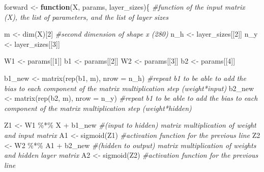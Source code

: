\documentclass[
]{article}
\newenvironment{Shaded}{\begin{snugshade}}{\end{snugshade}}
\newcommand{\AttributeTok}[1]{\textcolor[rgb]{0.77,0.63,0.00}{#1}}
\newcommand{\CommentTok}[1]{\textcolor[rgb]{0.56,0.35,0.01}{\textit{#1}}}
\newcommand{\ControlFlowTok}[1]{\textcolor[rgb]{0.13,0.29,0.53}{\textbf{#1}}}
\newcommand{\DecValTok}[1]{\textcolor[rgb]{0.00,0.00,0.81}{#1}}
\newcommand{\FunctionTok}[1]{\textcolor[rgb]{0.00,0.00,0.00}{#1}}
\newcommand{\NormalTok}[1]{#1}
\newcommand{\OtherTok}[1]{\textcolor[rgb]{0.56,0.35,0.01}{#1}}
\newcommand{\SpecialCharTok}[1]{\textcolor[rgb]{0.00,0.00,0.00}{#1}}
\begin{document}
\begin{Shaded}
\begin{Highlighting}[]
\NormalTok{forward }\OtherTok{\textless{}{-}} \ControlFlowTok{function}\NormalTok{(X, params, layer\_sizes)\{}
\CommentTok{\#function of the input matrix (X), the list of parameters, and the list of layer sizes}
  
\NormalTok{  m }\OtherTok{\textless{}{-}} \FunctionTok{dim}\NormalTok{(X)[}\DecValTok{2}\NormalTok{]  }\CommentTok{\#second dimension of shape x (280)}
\NormalTok{  n\_h }\OtherTok{\textless{}{-}}\NormalTok{ layer\_sizes[[}\DecValTok{2}\NormalTok{]]}
\NormalTok{  n\_y }\OtherTok{\textless{}{-}}\NormalTok{ layer\_sizes[[}\DecValTok{3}\NormalTok{]]}
  
\NormalTok{  W1 }\OtherTok{\textless{}{-}}\NormalTok{ params[[}\DecValTok{1}\NormalTok{]]}
\NormalTok{  b1 }\OtherTok{\textless{}{-}}\NormalTok{ params[[}\DecValTok{2}\NormalTok{]]}
\NormalTok{  W2 }\OtherTok{\textless{}{-}}\NormalTok{ params[[}\DecValTok{3}\NormalTok{]]}
\NormalTok{  b2 }\OtherTok{\textless{}{-}}\NormalTok{ params[[}\DecValTok{4}\NormalTok{]]}
  
\NormalTok{  b1\_new }\OtherTok{\textless{}{-}} \FunctionTok{matrix}\NormalTok{(}\FunctionTok{rep}\NormalTok{(b1, m), }\AttributeTok{nrow =}\NormalTok{ n\_h)  }\CommentTok{\#repeat b1 to be able to add the bias to each component of the matrix                                               multiplication step (weight*input)}
\NormalTok{  b2\_new }\OtherTok{\textless{}{-}} \FunctionTok{matrix}\NormalTok{(}\FunctionTok{rep}\NormalTok{(b2, m), }\AttributeTok{nrow =}\NormalTok{ n\_y)  }\CommentTok{\#repeat b1 to be able to add the bias to each component of the matrix                                               multiplication step (weight*hidden)}
  
\NormalTok{  Z1 }\OtherTok{\textless{}{-}}\NormalTok{ W1 }\SpecialCharTok{\%*\%}\NormalTok{ X }\SpecialCharTok{+}\NormalTok{ b1\_new  }\CommentTok{\#(input to hidden) matrix multiplication of weight and input matrix}
\NormalTok{  A1 }\OtherTok{\textless{}{-}} \FunctionTok{sigmoid}\NormalTok{(Z1) }\CommentTok{\#activation function for the previous line}
\NormalTok{  Z2 }\OtherTok{\textless{}{-}}\NormalTok{ W2 }\SpecialCharTok{\%*\%}\NormalTok{ A1 }\SpecialCharTok{+}\NormalTok{ b2\_new }\CommentTok{\#(hidden to output) matrix multiplication of weights and hidden layer matrix}
\NormalTok{  A2 }\OtherTok{\textless{}{-}} \FunctionTok{sigmoid}\NormalTok{(Z2) }\CommentTok{\#activation function for the previous line}


\end{Highlighting}
\end{Shaded}
\end{document}
